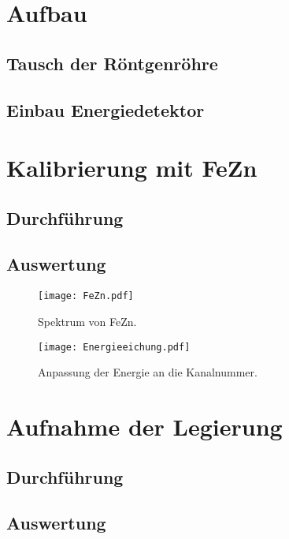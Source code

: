 \section{Aufbau}

\subsection{Tausch der Röntgenröhre}

\subsection{Einbau Energiedetektor}

\section{Kalibrierung mit FeZn}

\subsection{Durchführung}

\subsection{Auswertung}

\begin{figure}[htbp]
    \centering
    \texttt{[image: FeZn.pdf]}
    \caption{%
        Spektrum von FeZn.
    }
    \label{fig:FeZn}
\end{figure}

\begin{figure}[htbp]
    \centering
    \texttt{[image: Energieeichung.pdf]}
    \caption{%
        Anpassung der Energie an die Kanalnummer.
    }
    \label{fig:}
\end{figure}

\section{Aufnahme der Legierung}

\subsection{Durchführung}

\subsection{Auswertung}

